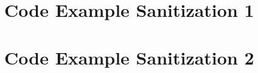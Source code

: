 \begin{appendix}
	\chapter{Code Example Sanitization 1}
 		
 	\chapter{Code Example Sanitization 2}
		
\end{appendix}





\newpage

%
\thispagestyle{empty}


